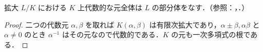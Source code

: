 \begin{prop}[代数元全体の部分体性]
拡大 $L/K$ における $K$ 上代数的な元全体は $L$ の部分体をなす．（参照：，．）
\end{prop}
\begin{proof}
二つの代数元 $\alpha,\beta$ を取れば $K(\alpha,\beta)$ は有限次拡大であり，$\alpha\pm\beta,\alpha\beta$ と $\alpha\ne0$ のとき $\alpha^{-1}$ はその元なので代数的である．$K$ の元も一次多項式の根である．
\end{proof}
